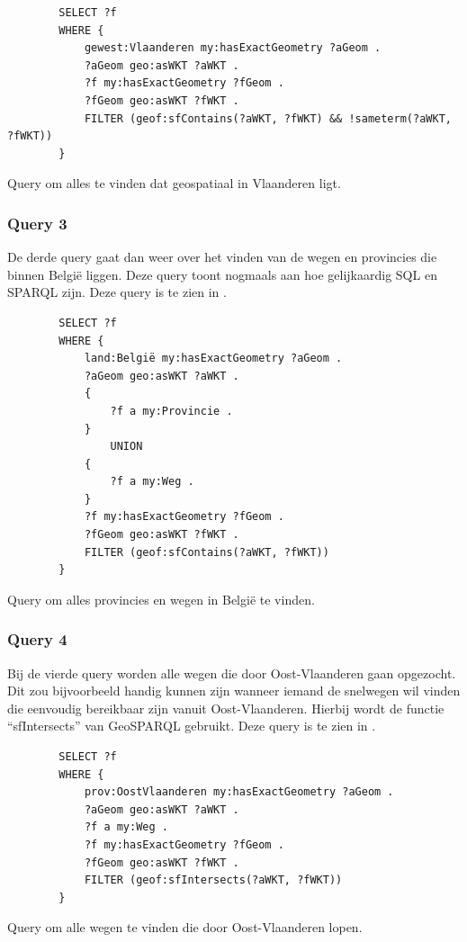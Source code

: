 \begin{listing}[ht]
    \begin{verbatim}
        SELECT ?f
        WHERE {
            gewest:Vlaanderen my:hasExactGeometry ?aGeom .
            ?aGeom geo:asWKT ?aWKT .
            ?f my:hasExactGeometry ?fGeom .
            ?fGeom geo:asWKT ?fWKT .
            FILTER (geof:sfContains(?aWKT, ?fWKT) && !sameterm(?aWKT, ?fWKT))
        }
    \end{verbatim}
    \caption{Query om alles te vinden dat geospatiaal in Vlaanderen ligt.}
    \label{listing:find_everything_flanders}
\end{listing}


\subsubsection{Query 3}
De derde query gaat dan weer over het vinden van de wegen en provincies die binnen België liggen. Deze query toont nogmaals aan hoe gelijkaardig SQL en SPARQL zijn. Deze query is te zien in .

\begin{listing}[ht]
    \begin{verbatim}
        SELECT ?f
        WHERE {
            land:België my:hasExactGeometry ?aGeom .
            ?aGeom geo:asWKT ?aWKT .
            {
                ?f a my:Provincie .
            }
                UNION
            {
                ?f a my:Weg .
            }
            ?f my:hasExactGeometry ?fGeom .
            ?fGeom geo:asWKT ?fWKT .
            FILTER (geof:sfContains(?aWKT, ?fWKT))
        }
    \end{verbatim}
    \caption{Query om alles provincies en wegen in België te vinden.}
    \label{listing:find_provinces_roads_belgium}
\end{listing}


\subsubsection{Query 4}
Bij de vierde query worden alle wegen die door Oost-Vlaanderen gaan opgezocht. Dit zou bijvoorbeeld handig kunnen zijn wanneer iemand de snelwegen wil vinden die eenvoudig bereikbaar zijn vanuit Oost-Vlaanderen. Hierbij wordt de functie ``sfIntersects'' van GeoSPARQL gebruikt. Deze query is te zien in .

\begin{listing}[ht]
    \begin{verbatim}
        SELECT ?f
        WHERE {
            prov:OostVlaanderen my:hasExactGeometry ?aGeom .
            ?aGeom geo:asWKT ?aWKT .
            ?f a my:Weg .
            ?f my:hasExactGeometry ?fGeom .
            ?fGeom geo:asWKT ?fWKT .
            FILTER (geof:sfIntersects(?aWKT, ?fWKT))
        }
    \end{verbatim}
    \caption{Query om alle wegen te vinden die door Oost-Vlaanderen lopen.}
    \label{listing:find_roads_passing_east_flanders}
\end{listing}



